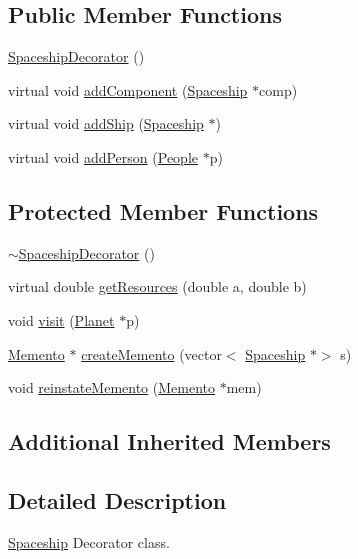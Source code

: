 \subsection*{Public Member Functions}
\begin{DoxyCompactItemize}
\item 
\hyperlink{classSpaceshipDecorator_a7a3248a02147d6b5399cd6fac9f73ed4}{Spaceship\+Decorator} ()
\item 
virtual void \hyperlink{classSpaceshipDecorator_a08442441af1fa8979f1e411a5e7b511c}{add\+Component} (\hyperlink{classSpaceship}{Spaceship} $\ast$comp)
\item 
virtual void \hyperlink{classSpaceshipDecorator_a5ed39419f5fab65dd4af11bf5136f7a4}{add\+Ship} (\hyperlink{classSpaceship}{Spaceship} $\ast$)
\item 
virtual void \hyperlink{classSpaceshipDecorator_a6e289d8a65f35b9f223255ae0eaa3b00}{add\+Person} (\hyperlink{classPeople}{People} $\ast$p)
\end{DoxyCompactItemize}
\subsection*{Protected Member Functions}
\begin{DoxyCompactItemize}
\item 
\hyperlink{classSpaceshipDecorator_ad29c1235cbfe963e073fd63ea607bf35}{$\sim$\+Spaceship\+Decorator} ()
\item 
virtual double \hyperlink{classSpaceshipDecorator_a5ee7a9a8c146c85f08591e47d971dce7}{get\+Resources} (double a, double b)
\item 
void \hyperlink{classSpaceshipDecorator_ae11d728646b22a33ce5bb465c23bab32}{visit} (\hyperlink{classPlanet}{Planet} $\ast$p)
\item 
\hyperlink{classMemento}{Memento} $\ast$ \hyperlink{classSpaceshipDecorator_a1acde91cd10517c94af41032aa5fdd9e}{create\+Memento} (vector$<$ \hyperlink{classSpaceship}{Spaceship} $\ast$$>$ s)
\item 
void \hyperlink{classSpaceshipDecorator_ac043134e491d99a8e0d985d7ce409a87}{reinstate\+Memento} (\hyperlink{classMemento}{Memento} $\ast$mem)
\end{DoxyCompactItemize}
\subsection*{Additional Inherited Members}


\subsection{Detailed Description}
\hyperlink{classSpaceship}{Spaceship} Decorator class. 

